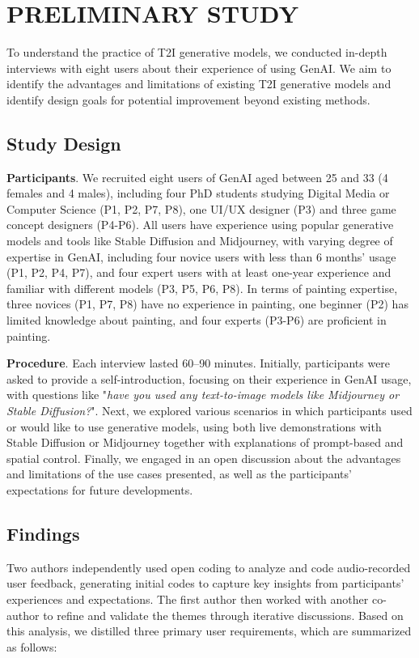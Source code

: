 \section{PRELIMINARY STUDY}\label{sec:formative study}
To understand the practice of T2I generative models, we conducted in-depth interviews with eight users about their experience of using GenAI. 
We aim to identify the advantages and limitations of existing T2I generative models and identify design goals for potential improvement beyond existing methods. 

\subsection{Study Design}
\textbf{Participants}.
We recruited eight users of GenAI aged between 25 and 33 (4 females and 4 males), including four PhD students studying Digital Media or Computer Science (P1, P2, P7, P8), one UI/UX designer (P3) and three game concept designers (P4-P6).
All users have experience using popular generative models and tools like Stable Diffusion and Midjourney, with varying degree of expertise in GenAI, including four novice users with less than 6 months' usage (P1, P2, P4, P7), and four expert users with at least one-year experience and familiar with different models (P3, P5, P6, P8). 
In terms of painting expertise, three novices (P1, P7, P8) have no experience in painting, one beginner (P2) has limited knowledge about painting, and four experts (P3-P6) are proficient in painting.

\noindent
\textbf{Procedure}.
Each interview lasted 60–90 minutes. 
Initially, participants were asked to provide a self-introduction, focusing on their experience in GenAI usage, with questions like "\emph{have you used any text-to-image models like Midjourney or Stable Diffusion?}". 
Next, we explored various scenarios in which participants used or would like to use generative models, using both live demonstrations with Stable Diffusion or Midjourney 
together with explanations of prompt-based and spatial control.
Finally, we engaged in an open discussion about the advantages and limitations of the use cases presented, as well as the participants' expectations for future developments.

\subsection{Findings}

Two authors independently used open coding to analyze and code audio-recorded user feedback, generating initial codes to capture key insights from participants' experiences and expectations. 
The first author then worked with another co-author to refine and validate the themes through iterative discussions.
Based on this analysis, we distilled three primary user requirements, which are summarized as follows:

